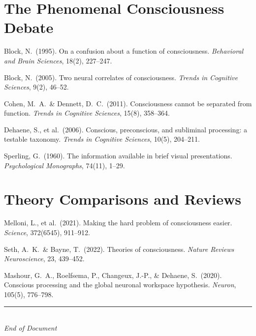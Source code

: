 \documentclass[11pt,a4paper]{report}
\begin{document}
\section*{The Phenomenal Consciousness Debate}
\begin{enumerate}[label={[\arabic*]}, leftmargin=2.5em, start=20]
  \item Block, N.\ (1995). On a confusion about a function of consciousness. \textit{Behavioral and Brain Sciences}, 18(2), 227--247.
  \item Block, N.\ (2005). Two neural correlates of consciousness. \textit{Trends in Cognitive Sciences}, 9(2), 46--52.
  \item Cohen, M.\ A.\ \& Dennett, D.\ C.\ (2011). Consciousness cannot be separated from function. \textit{Trends in Cognitive Sciences}, 15(8), 358--364.
  \item Dehaene, S., et al.\ (2006). Conscious, preconscious, and subliminal processing: a testable taxonomy. \textit{Trends in Cognitive Sciences}, 10(5), 204--211.
  \item Sperling, G.\ (1960). The information available in brief visual presentations. \textit{Psychological Monographs}, 74(11), 1--29.
\end{enumerate}

\section*{Theory Comparisons and Reviews}
\begin{enumerate}[label={[\arabic*]}, leftmargin=2.5em, start=25]
  \item Melloni, L., et al.\ (2021). Making the hard problem of consciousness easier. \textit{Science}, 372(6545), 911--912.
  \item Seth, A.\ K.\ \& Bayne, T.\ (2022). Theories of consciousness. \textit{Nature Reviews Neuroscience}, 23, 439--452.
  \item Mashour, G.\ A., Roelfsema, P., Changeux, J.-P., \& Dehaene, S.\ (2020). Conscious processing and the global neuronal workspace hypothesis. \textit{Neuron}, 105(5), 776--798.
\end{enumerate}

\vfill
\begin{center}
  {\color{gray}\rule{0.4\textwidth}{0.5pt}}\\[8pt]
  {\small\color{gray}\itshape End of Document}
\end{center}
\end{document}
